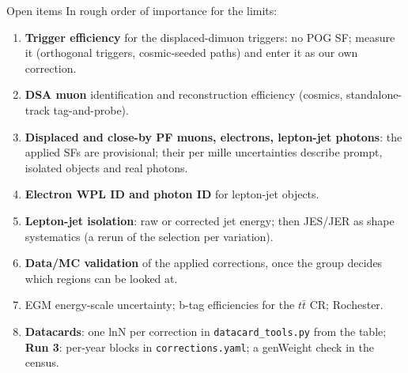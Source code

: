 \documentclass[aspectratio=169,11pt]{beamer}
\newcommand{\code}[1]{{\small\colorbox{codebg}{\texttt{#1}}}}
\begin{document}
\begin{frame}{Open items}
  In rough order of importance for the limits:
  \begin{enumerate}
    \small
    \item \textbf{Trigger efficiency} for the displaced-dimuon triggers: no POG SF; measure it
          (orthogonal triggers, cosmic-seeded paths) and enter it as our own correction.
    \item \textbf{DSA muon} identification and reconstruction efficiency (cosmics,
          standalone-track tag-and-probe).
    \item \textbf{Displaced and close-by PF muons, electrons, lepton-jet photons}: the applied
          SFs are provisional; their per mille uncertainties describe prompt, isolated objects
          and real photons.
    \item \textbf{Electron WPL ID and photon ID} for lepton-jet objects.
    \item \textbf{Lepton-jet isolation}: raw or corrected jet energy; then JES/JER as shape
          systematics (a rerun of the selection per variation).
    \item \textbf{Data/MC validation} of the applied corrections, once the group decides which
          regions can be looked at.
    \item EGM energy-scale uncertainty; b-tag efficiencies for the $t\bar t$ CR; Rochester.
    \item \textbf{Datacards}: one lnN per correction in \code{datacard\_tools.py} from the table;
          \textbf{Run 3}: per-year blocks in \code{corrections.yaml}; a genWeight check in the census.
  \end{enumerate}
\end{frame}
\end{document}
